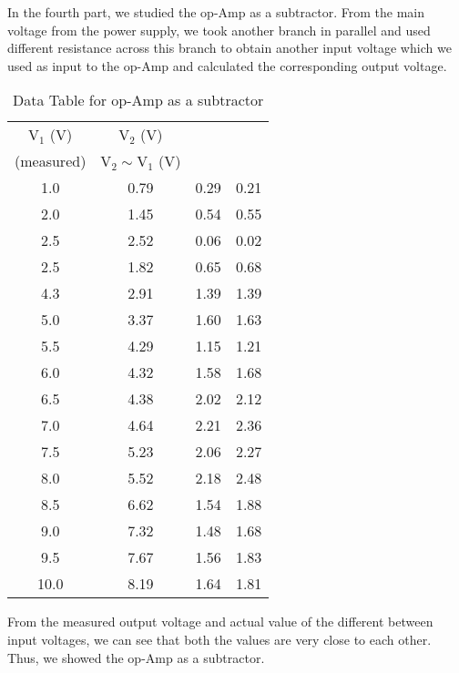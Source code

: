 \documentclass{scrartcl}
\begin{document}
In the fourth part, we studied the op-Amp as a subtractor. From the main voltage from the power supply, we took another branch in parallel and used different resistance across this branch to obtain another input voltage which we used as input to the op-Amp and calculated the corresponding output voltage.
    \begin{table}[H]
        \centering
        \begin{tabular}{|c|c|c|c|}
        \hline
        $\mathrm{V_1}$ (\si{V}) & $\mathrm{V_2}$ (\si{V}) & \thead{$\mathrm{V_{\text{out}}}\si{(V)}$\\ (measured)} & $\mathrm{V_2} \sim \mathrm{V_1}$ (\si{V}) \\ \hline
        1.0    & 0.79 & 0.29 & 0.21 \\ \hline
        2.0    & 1.45 & 0.54 & 0.55 \\ \hline
        2.5  & 2.52 & 0.06 & 0.02 \\ \hline
        2.5  & 1.82 & 0.65 & 0.68 \\ \hline
        4.3  & 2.91 & 1.39 & 1.39 \\ \hline
        5.0    & 3.37 & 1.60  & 1.63 \\ \hline
        5.5  & 4.29 & 1.15 & 1.21 \\ \hline
        6.0   & 4.32 & 1.58 & 1.68 \\ \hline
        6.5  & 4.38 & 2.02 & 2.12 \\ \hline
        7.0    & 4.64 & 2.21 & 2.36 \\ \hline
        7.5  & 5.23 & 2.06 & 2.27 \\ \hline
        8.0    & 5.52 & 2.18 & 2.48 \\ \hline
        8.5  & 6.62 & 1.54 & 1.88 \\ \hline
        9.0   & 7.32 & 1.48 & 1.68 \\ \hline
        9.5  & 7.67 & 1.56 & 1.83 \\ \hline
        10.0   & 8.19 & 1.64 & 1.81 \\ \hline
        \end{tabular}
        \caption{Data Table for op-Amp as a subtractor}
        \label{tab:voltage_measurements_diff}
        \end{table}
\noindent
From the measured output voltage and actual value of the different between input voltages, we can see that both the values are very close to each other. Thus, we showed the op-Amp as a subtractor.
\end{document}

